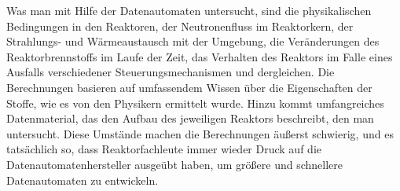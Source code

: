 {Was man mit Hilfe der Datenautomaten untersucht, sind die physikalischen Bedingungen in den Reaktoren, der Neutronenfluss im Reaktorkern, der Strahlungs- und Wärmeaustausch mit der Umgebung, die Veränderungen des Reaktorbrennstoffs im Laufe der Zeit, das Verhalten des Reaktors im Falle eines Ausfalls verschiedener Steuerungsmechanismen und dergleichen. Die Berechnungen basieren auf umfassendem Wissen über die Eigenschaften der Stoffe, wie es von den Physikern ermittelt wurde. Hinzu kommt umfangreiches Datenmaterial, das den Aufbau des jeweiligen Reaktors beschreibt, den man untersucht. Diese Umstände machen die Berechnungen äußerst schwierig, und es tatsächlich so, dass Reaktorfachleute immer wieder Druck auf die Datenautomatenhersteller ausgeübt haben, um größere und schnellere Datenautomaten zu entwickeln.
}


